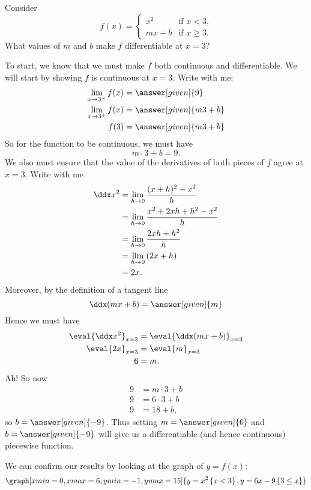 \documentclass{ximera}
\begin{document}
\begin{example}
  Consider
  \[
  f(x) = \begin{cases}
          x^2 &\text{if $x<3$,}\\
          mx+b &\text{if $x\ge 3$.}
         \end{cases}
  \]
  What values of $m$ and $b$ make $f$ differentiable at $x=3$?
  \begin{explanation}
    To start, we know that we must make $f$ both continuous and
    differentiable. We will start by showing $f$ is continuous at
    $x=3$. Write with me:
    \begin{align*}
      \lim_{x\to 3^-} f(x) &= \answer[given]{9}\\
      \lim_{x\to 3^+} f(x) &= \answer[given]{m 3 + b}\\
      f(3) &= \answer[given]{m 3 + b}
    \end{align*}
    So for the function to be continuous, we must have
    \[
    m\cdot 3 + b =9.
    \]
    We also must ensure that the value of the derivatives of both
    pieces of $f$ agree at $x=3$. Write with me
    \begin{align*}
      \ddx x^2 &= \lim_{h\to 0}\frac{(x+h)^2-x^2}{h}\\
      &= \lim_{h\to 0}\frac{x^2 + 2xh + h^2 - x^2}{h}\\
      &= \lim_{h\to 0}\frac{2xh + h^2}{h}\\
      &= \lim_{h\to 0}\left(2x + h\right)\\
      &=2x.
    \end{align*}
    Moreover, by the definition of a tangent line
    \[
    \ddx(mx+ b) = \answer[given]{m}
    \]
    Hence we must have
    \begin{align*}
      \eval{\ddx x^2}_{x=3} &= \eval{\ddx(mx+b)}_{x=3}\\
      \eval{2x}_{x=3} &= \eval{m}_{x=3}\\
      6 &= m.
    \end{align*}
    Ah! So now
    \begin{align*}
      9 &= m\cdot 3 + b\\
      9 &= 6\cdot 3 + b\\
      9 &= 18 + b,
    \end{align*}
    so $b=\answer[given]{-9}$. Thus setting $m=\answer[given]{6}$ and
    $b=\answer[given]{-9}$ will give us a differentiable (and hence
    continuous) piecewise function.
    \begin{onlineOnly}
      We can confirm our results by looking at the graph of $y=f(x)$:
      \[
      \graph[xmin=0,xmax=6,ymin=-1,ymax=15]{y=x^2\left\{x<3\right\},y=6x-9\left\{3 \leq x\right\}} 
      \]
    \end{onlineOnly}
  \end{explanation}
\end{example}
\end{document}
